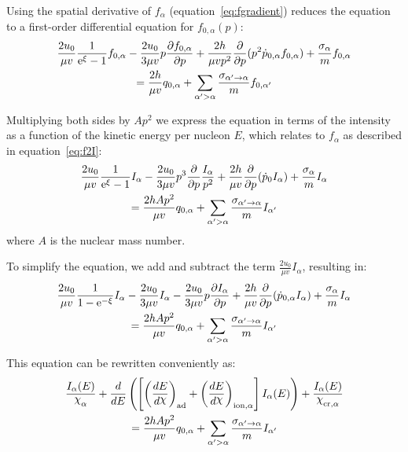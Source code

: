 Using the spatial derivative of $f_\alpha$ (equation~\ref{eq:fgradient}) reduces the equation to a first-order differential equation for $f_{0,\alpha}(p)$:
%
\begin{multline}
\frac{2 u_0}{\mu v} \frac{1}{{\rm e}^\xi - 1} f_{0,\alpha}
- \frac{2 u_0}{3 \mu v}  p \frac{\partial f_{0,\alpha}}{\partial p}
+ \frac{2 h}{\mu v p^2} \frac{\partial}{\partial p}(p^2 \dot{p}_{0,\alpha} f_{0,\alpha} ) 
+ \frac{\sigma_\alpha}{m} f_{0,\alpha} \\
= \frac{2h}{\mu v} q_{0,\alpha} 
+ \sum_{\alpha'>\alpha} \frac{\sigma_{\alpha'\rightarrow\alpha}}{m}  f_{0,\alpha'}
\end{multline}

Multiplying both sides by $A p^2$ we express the equation in terms of the intensity as a function of the kinetic energy per nucleon $E$, which relates to $f_\alpha$ as described in equation~\ref{eq:f2I}: 
%
\begin{multline}
\frac{2 u_0}{\mu v} \frac{1}{{\rm e}^\xi - 1} I_\alpha
- \frac{2 u_0}{3 \mu v} p^3 \frac{\partial}{\partial p} \frac{I_\alpha}{p^2}
+ \frac{2 h}{\mu v} \frac{\partial}{\partial p}(\dot{p}_0 I_\alpha) 
+ \frac{\sigma_\alpha}{m} I_\alpha \\
= \frac{2h A p^2}{\mu v} q_{0,\alpha} 
+ \sum_{\alpha'>\alpha} \frac{\sigma_{\alpha'\rightarrow\alpha}}{m}  I_{\alpha'}
\end{multline}
%
where $A$ is the nuclear mass number.

To simplify the equation, we add and subtract the term $\frac{2u_0}{\mu v} I_\alpha$, resulting in:
%
\begin{multline}
\frac{2 u_0}{\mu v} \frac{1}{1-{\rm e}^{-\xi}} I_\alpha
- \frac{2 u_0}{3 \mu v} I_\alpha 
- \frac{2 u_0}{3 \mu v} p \frac{\partial I_\alpha}{\partial p} 
+ \frac{2 h}{\mu v} \frac{\partial}{\partial p}(\dot{p}_{0,\alpha} I_\alpha) 
+ \frac{\sigma_\alpha}{m} I_\alpha \\
= \frac{2h A p^2}{\mu v} q_{0,\alpha} 
+ \sum_{\alpha'>\alpha} \frac{\sigma_{\alpha'\rightarrow\alpha}}{m}  I_{\alpha'}
\end{multline}

This equation can be rewritten conveniently as:
%
\begin{multline}
\frac{I_\alpha(E)}{\rchi_\alpha}
+ \frac{d}{dE} \left( \left[ \left( \frac{dE}{d\rchi}\right)_{\rm ad} + \left( \frac{dE}{d\rchi} \right)_{\rm ion, \alpha} \right] I_\alpha(E) \right)
+ \frac{I_\alpha(E)}{\rchi_{\rm cr, \alpha}} \\
= \frac{2h A p^2}{\mu v} q_{0,\alpha} 
+ \sum_{\alpha'>\alpha} \frac{\sigma_{\alpha'\rightarrow\alpha}}{m}  I_{\alpha'}
\label{eq:fulltransport3}
\end{multline}

